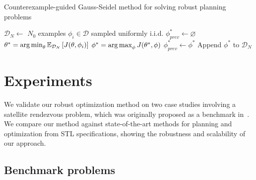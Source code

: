 \begin{algorithm}
    \caption{Counterexample-guided Gauss-Seidel method for solving robust planning problems}\label{ch:iros:alg:cg_gs}
    \DontPrintSemicolon
    $\mathcal{D}_N \gets $ $N_0$ examples $\phi_i \in \mathcal{D}$ sampled uniformly i.i.d.\;
    $\phi^*_{prev} \gets \varnothing$\;
    {
    $\theta^* = \operatorname*{arg\,min}_\theta \mathbb{E}_{\mathcal{D}_N} \left[ J(\theta, \phi_i) \right] \label{ch:iros:alg:opt_theta}$ \;
    $\phi^* = \operatorname*{arg\,max}_\phi J(\theta^*, \phi)$ \label{ch:iros:alg:opt_chi} \;
    $\phi^*_{prev} \gets \phi^*$\;
    Append $\phi^*$ to $\mathcal{D}_N$\;
    }
\end{algorithm}

\section{Experiments}\label{ch:iros:experiments}

We validate our robust optimization method on two case studies involving a satellite rendezvous problem, which was originally proposed as a benchmark in~\cite{jewisonSpacecraftBenchmarkProblem2016}. We compare our method against state-of-the-art methods for planning and optimization from STL specifications, showing the robustness and scalability of our approach.

\subsection{Benchmark problems}

